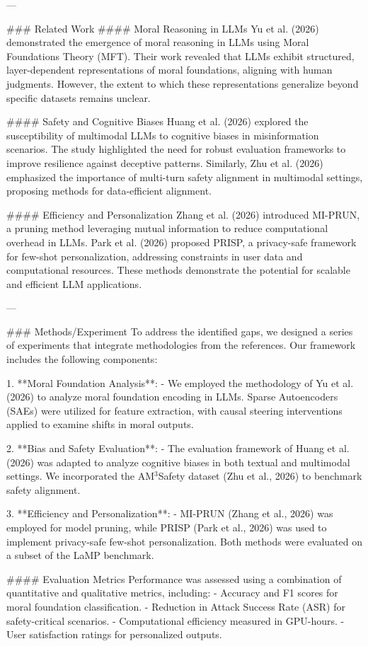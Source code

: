 ---

### Related Work
#### Moral Reasoning in LLMs
Yu et al. (2026) demonstrated the emergence of moral reasoning in LLMs using Moral Foundations Theory (MFT). Their work revealed that LLMs exhibit structured, layer-dependent representations of moral foundations, aligning with human judgments. However, the extent to which these representations generalize beyond specific datasets remains unclear.

#### Safety and Cognitive Biases
Huang et al. (2026) explored the susceptibility of multimodal LLMs to cognitive biases in misinformation scenarios. The study highlighted the need for robust evaluation frameworks to improve resilience against deceptive patterns. Similarly, Zhu et al. (2026) emphasized the importance of multi-turn safety alignment in multimodal settings, proposing methods for data-efficient alignment.

#### Efficiency and Personalization
Zhang et al. (2026) introduced MI-PRUN, a pruning method leveraging mutual information to reduce computational overhead in LLMs. Park et al. (2026) proposed PRISP, a privacy-safe framework for few-shot personalization, addressing constraints in user data and computational resources. These methods demonstrate the potential for scalable and efficient LLM applications.

---

### Methods/Experiment
To address the identified gaps, we designed a series of experiments that integrate methodologies from the references. Our framework includes the following components:

1. **Moral Foundation Analysis**:
   - We employed the methodology of Yu et al. (2026) to analyze moral foundation encoding in LLMs. Sparse Autoencoders (SAEs) were utilized for feature extraction, with causal steering interventions applied to examine shifts in moral outputs.
   
2. **Bias and Safety Evaluation**:
   - The evaluation framework of Huang et al. (2026) was adapted to analyze cognitive biases in both textual and multimodal settings. We incorporated the AM$^3$Safety dataset (Zhu et al., 2026) to benchmark safety alignment.

3. **Efficiency and Personalization**:
   - MI-PRUN (Zhang et al., 2026) was employed for model pruning, while PRISP (Park et al., 2026) was used to implement privacy-safe few-shot personalization. Both methods were evaluated on a subset of the LaMP benchmark.

#### Evaluation Metrics
Performance was assessed using a combination of quantitative and qualitative metrics, including:
- Accuracy and F1 scores for moral foundation classification.
- Reduction in Attack Success Rate (ASR) for safety-critical scenarios.
- Computational efficiency measured in GPU-hours.
- User satisfaction ratings for personalized outputs.

